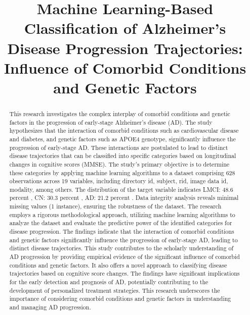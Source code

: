 \documentclass[conference]{IEEEtran}
\begin{document}
\title{Machine Learning-Based Classification of Alzheimer's Disease Progression Trajectories: Influence of Comorbid Conditions and Genetic Factors}

\author{
}

\maketitle

\begin{abstract}
This research investigates the complex interplay of comorbid conditions and genetic factors in the progression of early-stage Alzheimer's disease (AD). The study hypothesizes that the interaction of comorbid conditions such as cardiovascular disease and diabetes, and genetic factors such as APOE4 genotype, significantly influence the progression of early-stage AD. These interactions are postulated to lead to distinct disease trajectories that can be classified into specific categories based on longitudinal changes in cognitive scores (MMSE). The study's primary objective is to determine these categories by applying machine learning algorithms to a dataset comprising 628 observations across 19 variables, including directory id, subject, rid, image data id, modality, among others. The distribution of the target variable indicates LMCI: 48.6 percent , CN: 30.3 percent , AD: 21.2 percent . Data integrity analysis reveals minimal missing values (1 instance), ensuring the robustness of the dataset. The research employs a rigorous methodological approach, utilizing machine learning algorithms to analyze the dataset and evaluate the predictive power of the identified categories for disease progression. The findings indicate that the interaction of comorbid conditions and genetic factors significantly influence the progression of early-stage AD, leading to distinct disease trajectories. This study contributes to the scholarly understanding of AD progression by providing empirical evidence of the significant influence of comorbid conditions and genetic factors. It also offers a novel approach to classifying disease trajectories based on cognitive score changes. The findings have significant implications for the early detection and prognosis of AD, potentially contributing to the development of personalized treatment strategies. This research underscores the importance of considering comorbid conditions and genetic factors in understanding and managing AD progression.
\end{abstract}
\end{document}

